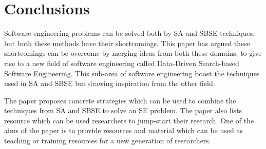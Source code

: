 \documentclass[table, xcdraw, sigconf,review, anonymous]{acmart}
\begin{document}
\section{Conclusions}
Software engineering problems can be solved both by SA and SBSE techniques, but both these methods have their shortcomings. This paper has argued these shortcomings can be overcome by merging ideas from both these domains, to give rise to a new field of software engineering called Data-Driven Search-based Software Engineering. This sub-area of software engineering boost the techniques used in SA and SBSE but drawing inspiration from the other field. 

The paper proposes concrete strategies which can be used to combine the techniques from SA and SBSE to solve an SE problem. The paper also lists resource which can be used researchers to jump-start their research. One of the aims of the paper is to provide resources and material which can be used as teaching or training resources for a new generation of researchers. 

% 
% 


 
\end{document}
